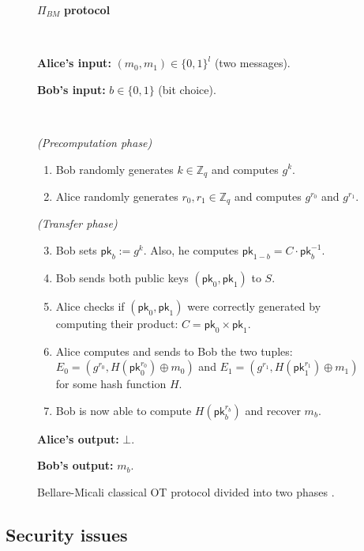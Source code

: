 \begin{figure}[h!]
\centering
\begin{tcolorbox}
                        
    \centerline{$\Pi_{BM}$ \textbf{protocol}}
            
    \
    
    \textbf{Alice's input:} $(m_0, m_1)\in\{0,1\}^l$ (two messages). 
    
    \textbf{Bob's input:} $b\in\{0,1\}$ (bit choice).
    
    \
    
    \textit{(Precomputation phase)}
    \begin{enumerate}
         \item Bob randomly generates $k\in \mathbb{Z}_q$ and computes $g^k$.
         \item Alice randomly generates $r_0, r_1\in \mathbb{Z}_q$ and computes $g^{r_0}$ and $g^{r_1}$.
    \end{enumerate}
    \textit{(Transfer phase)}
    \begin{enumerate}
    \setcounter{enumi}{2}
        \item Bob sets $\mathsf{pk}_b := g^k$. Also, he computes $\mathsf{pk}_{1-b} = C \cdot \mathsf{pk}_b^{-1}$.
        \item Bob sends both public keys $(\mathsf{pk}_0, \mathsf{pk}_1)$ to $S$.
        \item Alice checks if $(\mathsf{pk}_0, \mathsf{pk}_1)$ were correctly generated by computing their product: $C = \mathsf{pk}_0 \times \mathsf{pk}_1$.
        \item Alice computes and sends to Bob the two tuples: $E_0 = ( g^{r_0}, H(\mathsf{pk}_0^{r_0})\oplus m_0 )$ and $E_1 = ( g^{r_1}, H(\mathsf{pk}_1^{r_1})\oplus m_1 )$ for some hash function $H$.
        \item Bob is now able to compute $H(\mathsf{pk}_b^{r_b})$ and recover $m_b$.
    \end{enumerate} 
    
    \textbf{Alice's output:} $\bot$.
    
    \textbf{Bob's output:} $m_b$.
    
\end{tcolorbox} 
	\caption{Bellare-Micali classical OT protocol divided into two phases \cite{BM89}.}
	\label{fig:BMOTProtocol}
\end{figure}

\subsection{Security issues}

